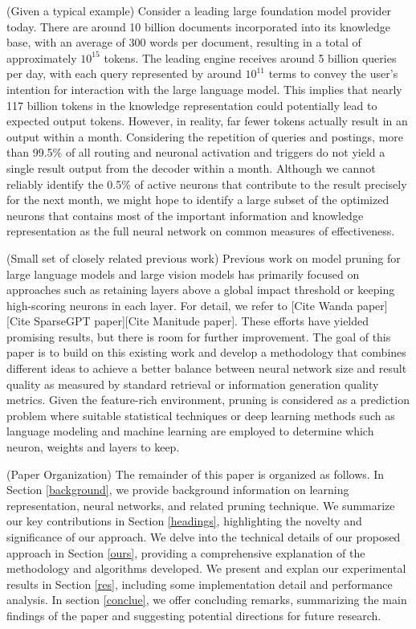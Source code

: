 \documentclass{article} %
\begin{document}
(Given a typical example) Consider a leading large foundation model provider today. There are around 10 billion documents incorporated into its knowledge base, with an average of 300 words per document, resulting in a total of approximately $10^{15}$ tokens. The leading engine receives around 5 billion queries per day, with each query represented by around $10^{11}$ terms to convey the user's intention for interaction with the large language model. This implies that nearly 117 billion tokens in the knowledge representation could potentially lead to expected output tokens. 
However, in reality, far fewer tokens actually result in an output within a month. Considering the repetition of queries and postings, more than 99.5\% of all routing and neuronal activation and triggers do not yield a single result output from the decoder within a month. Although we cannot reliably identify the 0.5\% of active neurons that contribute to the result precisely for the next month, we might hope to identify a large subset of the optimized neurons that contains most of the important information and knowledge representation as the full neural network on common measures of effectiveness.

(Small set of closely related previous work) Previous work on model pruning for large language models and large vision models has primarily focused on approaches such as retaining layers above a global impact threshold or keeping high-scoring neurons in each layer. For detail, we refer to [Cite Wanda paper][Cite SparseGPT paper][Cite Manitude paper]. These efforts have yielded promising results, but there is room for further improvement. The goal of this paper is to build on this existing work and develop a methodology that combines different ideas to achieve a better balance between neural network size and result quality as measured by standard retrieval or information generation quality metrics. Given the feature-rich environment, pruning is considered as a prediction problem where suitable statistical techniques or deep learning methods such as language modeling and machine learning are employed to determine which neuron, weights and layers to keep.

(Paper Organization) The remainder of this paper is organized as follows. In Section \ref{background}, we provide background information on learning representation, neural networks, and related pruning technique. We summarize our key contributions in Section \ref{headings}, highlighting the novelty and significance of our approach. We delve into the technical details of our proposed approach in Section \ref{ours}, providing a comprehensive explanation of the methodology and algorithms developed. We present and explan our experimental results in Section \ref{res}, including some implementation detail and performance analysis. In section \ref{conclue}, we offer concluding remarks, summarizing the main findings of the paper and suggesting potential directions for future research.
\end{document}
